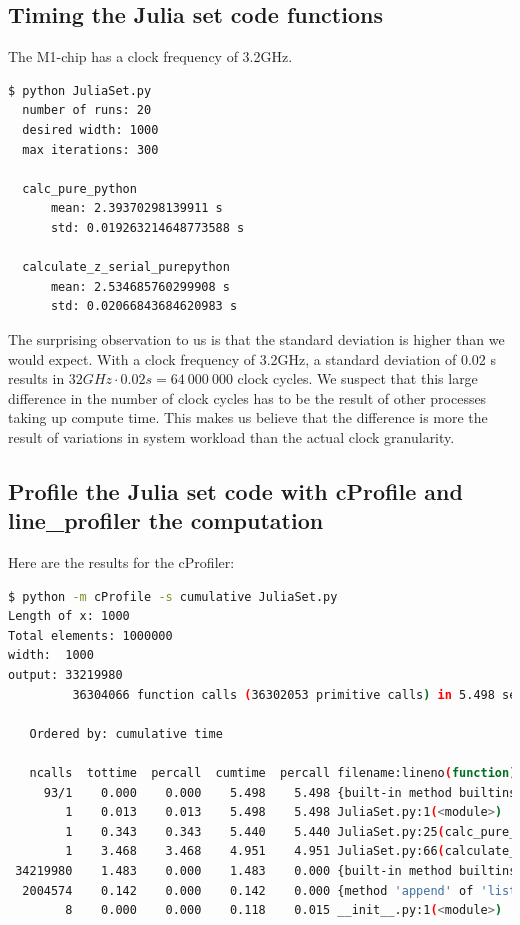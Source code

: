 \documentclass[a4paper,12pt]{article}
\begin{document}
\subsection{Timing the Julia set code functions}
The M1-chip has a clock frequency of 3.2GHz.
\begin{lstlisting}[language=bash,basicstyle=\ttfamily]
  $ python JuliaSet.py
  number of runs: 20
  desired width: 1000
  max iterations: 300

  calc_pure_python
      mean: 2.39370298139911 s
      std: 0.019263214648773588 s

  calculate_z_serial_purepython
      mean: 2.534685760299908 s
      std: 0.02066843684620983 s
\end{lstlisting}
The surprising observation to us is that the standard deviation is higher than we would expect.
With a clock frequency of 3.2GHz, a standard deviation of 0.02 s results in $32GHz \cdot 0.02s = 64\ 000\ 000$ clock cycles.
We suspect that this large difference in the number of clock cycles has to be the result of other processes taking up compute time.
This makes us believe that the difference is more the result of variations in system workload than the actual clock granularity.

\subsection{Profile the Julia set code with cProfile and line\_profiler the computation}

Here are the results for the cProfiler:
\begin{lstlisting}[language=bash,basicstyle=\scriptsize\ttfamily]
$ python -m cProfile -s cumulative JuliaSet.py
Length of x: 1000
Total elements: 1000000
width:	1000
output:	33219980
         36304066 function calls (36302053 primitive calls) in 5.498 seconds

   Ordered by: cumulative time

   ncalls  tottime  percall  cumtime  percall filename:lineno(function)
     93/1    0.000    0.000    5.498    5.498 {built-in method builtins.exec}
        1    0.013    0.013    5.498    5.498 JuliaSet.py:1(<module>)
        1    0.343    0.343    5.440    5.440 JuliaSet.py:25(calc_pure_python)
        1    3.468    3.468    4.951    4.951 JuliaSet.py:66(calculate_z_serial_purepython)
 34219980    1.483    0.000    1.483    0.000 {built-in method builtins.abs}
  2004574    0.142    0.000    0.142    0.000 {method 'append' of 'list' objects}
        8    0.000    0.000    0.118    0.015 __init__.py:1(<module>)
\end{lstlisting}
\end{document}
